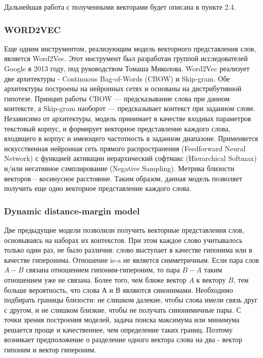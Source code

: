 Дальнейшая работа с полученными векторами будет описана в пункте 2.4.


\subsubsection{WORD2VEC}

Еще одним инструментом, реализующим модель векторного представления слов, является
Word2Vec. Этот инструмент был разработан группой исследователей Google в 2013 году,
под руководством Томаша Миколова.
Word2Vec реализует две архитектуры - Continuous Bag-of-Words (CBOW) и Skip-gram. Обе
архитектуры построены на нейронных сетях и основаны на дистрибутивной гипотезе.
Принцип работы CBOW — предсказывание слова при данном контексте, а Skip-gram
наоборот — предсказывает контекст при заданном слове. Независимо от архитектуры,
модель принимает в качестве входных параметров текстовый корпус, и формирует
векторное представление каждого слова, входящего в корпус и имеющего частотность в
заданном диапазоне.
Применяется искусственная нейронная сеть прямого распространения (Feedforward Neural
Network) с функцией активации иерархический софтмакс (Hierarchical Softmax) и/или
негативное сэмплирование (Negative Sampling). Метрика близости векторов – косинусное
расстояние.
Таким образом, данная модель позволяет получить еще одно векторное представление
каждого слова.

\subsubsection{Dynamic distance-margin model}

Две предыдущие модели позволили получить векторные представления слов,
основываясь на наборах их контекстов. При этом каждое слово учитывалось
только один раз, не было различия: слово выступает в качестве гипонима или в
качестве гиперонима.
Отношение is-a не является симметричным. Если пара слов $A-B$ связана
отношением гипоним-гипероним, то пара $B-A$ таким отношением уже не связана.
Более того, чем ближе вектор $A$ к вектору $B$, тем больше вероятность, что слова $А$
и $В$ являются синонимами. Необходимо подбирать границы близости: не слишком
далекие, чтобы слова имели связь друг с другом, и не слишком близкие, чтобы не
получать синонимичные пары. С точки зрения построения моделей, задача поиска
максимума или минимума решается проще и качественнее, чем определение таких
границ. Поэтому возникает предположение о разделение одного вектора слова на
два - вектор гипоним и вектор гипероним.

